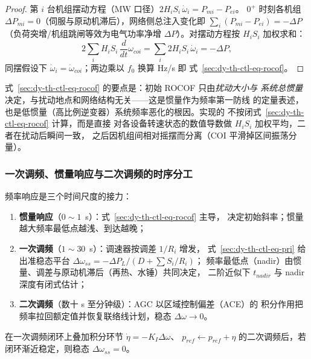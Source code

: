 \begin{proof}
第 $i$ 台机组摆动方程（MW 口径）$2H_iS_i\,\dot\omega_i=P_{mi}-P_{ei}$。
$0^+$ 时刻各机组 $\Delta P_{mi}=0$（伺服与原动机滞后），网络侧总注入变化即
$\sum_i(P_{mi}-P_{ei})=-\Delta P$（负荷突增/机组跳闸等效为电气功率净增
$\Delta P$）。对摆动方程按 $H_iS_i$ 加权求和：
\begin{equation}
2\sum_i H_iS_i\,\frac{d}{dt}\omega_{coi}
=\sum_i 2H_iS_i\,\dot\omega_i=-\Delta P,
\end{equation}
同摆假设下 $\dot\omega_i=\dot\omega_{coi}$；两边乘以 $f_0$ 换算 Hz/s 即
式~\eqref{sec:dy-th-ctl-eq-rocof}。
\end{proof}

\begin{remark}
式~\eqref{sec:dy-th-ctl-eq-rocof} 的要点是：初始 ROCOF 只由\emph{扰动大小与
系统总惯量}决定，与扰动地点和网络结构无关——这是惯量作为频率第一防线
的定量表述，也是低惯量（高比例逆变器）系统频率恶化的根因。实现的
 不按闭式~\eqref{sec:dy-th-ctl-eq-rocof} 计算，而是直接
对各设备转速状态的数值导数做 $H_iS_i$ 加权平均，二者在扰动后瞬间一致，
之后因机组间相对摇摆而分离（COI 平滑掉区间振荡分量）。
\end{remark}

\subsubsection{一次调频、惯量响应与二次调频的时序分工}

频率响应是三个时间尺度的接力：
\begin{enumerate}
  \item \textbf{惯量响应}（$0\sim1$~s）：式~\eqref{sec:dy-th-ctl-eq-rocof} 主导，
        决定初始斜率；惯量越大频率最低点越浅、到达越晚；
  \item \textbf{一次调频}（$1\sim30$~s）：调速器按调差 $1/R_i$ 增发，
        式~\eqref{sec:dy-th-ctl-eq-pri} 给出准稳态平台
        $\Delta\omega_{ss}=-\Delta P_L/(D+\sum S_i/R_i)$；
        频率最低点（nadir）由惯量、调差与原动机滞后（再热、水锤）共同决定，
        二阶近似下 $t_{nadir}$ 与 nadir 深度有闭式估计；
  \item \textbf{二次调频}（数十 s 至分钟级）：AGC 以区域控制偏差（ACE）的
        积分作用把频率拉回额定值并恢复联络线计划，稳态 $\Delta\omega\to0$。
\end{enumerate}

\begin{proposition}[二次调频的无差性]\label{sec:dy-th-ctl-prop-agc}
在一次调频闭环上叠加积分环节 $\dot\eta=-K_I\Delta\omega$、
$p_{ref}\leftarrow p_{ref}+\eta$ 的二次调频后，若闭环渐近稳定，则稳态
$\Delta\omega_{ss}=0$。
\end{proposition}


